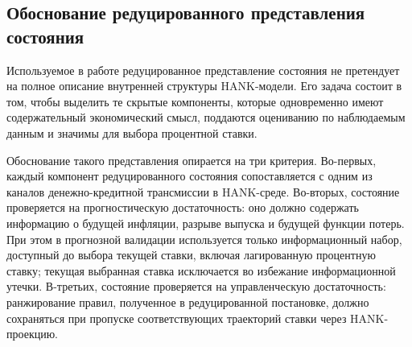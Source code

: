 \subsection{Обоснование редуцированного представления состояния}

Используемое в работе редуцированное представление состояния не претендует на полное описание внутренней структуры HANK-модели. Его задача состоит в том, чтобы выделить те скрытые компоненты, которые одновременно имеют содержательный экономический смысл, поддаются оцениванию по наблюдаемым данным и значимы для выбора процентной ставки.

Обоснование такого представления опирается на три критерия. Во-первых, каждый компонент редуцированного состояния сопоставляется с одним из каналов денежно-кредитной трансмиссии в HANK-среде. Во-вторых, состояние проверяется на прогностическую достаточность: оно должно содержать информацию о будущей инфляции, разрыве выпуска и будущей функции потерь. При этом в прогнозной валидации используется только информационный набор, доступный до выбора текущей ставки, включая лагированную процентную ставку; текущая выбранная ставка исключается во избежание информационной утечки. В-третьих, состояние проверяется на управленческую достаточность: ранжирование правил, полученное в редуцированной постановке, должно сохраняться при пропуске соответствующих траекторий ставки через HANK-проекцию.

\begin{table}[htbp]
\centering
\small
\caption{Экономическая интерпретация компонент редуцированного состояния}
\label{tab:reduced_state_components}

\end{table}

\begin{table}[htbp]
\centering
\small
\caption{Прогностическая достаточность альтернативных представлений состояния}
\label{tab:forecast_sufficiency}

\end{table}

\begin{table}[htbp]
\centering
\small
\caption{Сценарная прогностическая достаточность для будущей функции потерь}
\label{tab:future_loss_scenario_forecast}

\end{table}


